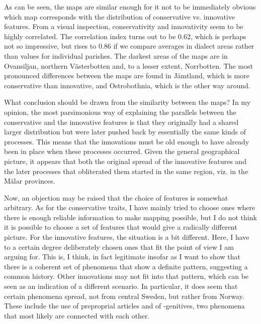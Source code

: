 As can be seen, the maps are similar enough for it not to be immediately obvious which map corresponds with the distribution of conservative vs. innovative features. From a visual inspection, conservativity and innovativity seem to be highly correlated. The correlation index turns out to be 0.62, which is perhaps not so impressive, but rises to 0.86 if we compare averages in dialect areas rather than values for individual parishes. The darkest areas of the maps are in Ovansiljan, northern Västerbotten and, to a lesser extent, Norrbotten. The most pronounced differences between the maps are found in Jämtland, which is more conservative than innovative, and Ostrobothnia, which is the other way around. 


What conclusion should be drawn from the similarity between the maps? In my opinion, the most parsimonious way of explaining the parallels between the conservative and the innovative features is that they originally had a shared larger distribution but were later pushed back by essentially the same kinds of processes. This means that the innovations must be old enough to have already been in place when these processes occurred. Given the general geographical picture, it appears that both the original spread of the innovative features and the later processes that obliterated them started in the same region, viz. in the Mälar provinces. 


Now, an objection may be raised that the choice of features is somewhat arbitrary. As for the conservative traits, I have mainly tried to choose ones where there is enough reliable information to make mapping possible, but I do not think it is possible to choose a set of features that would give a radically different picture. For the innovative features, the situation is a bit different. Here, I have to a certain degree deliberately chosen ones that fit the point of view I am arguing for. This is, I think, in fact legitimate insofar as I want to show that there is a coherent set of phenomena that show a definite pattern, suggesting a common history. Other innovations may not fit into that pattern, which can be seen as an indication of a different scenario. In particular, it does seem that certain phenomena spread, not from central Sweden, but rather from Norway. These include the use of preproprial articles and of -genitives, two phenomena that most likely are connected with each other. 

